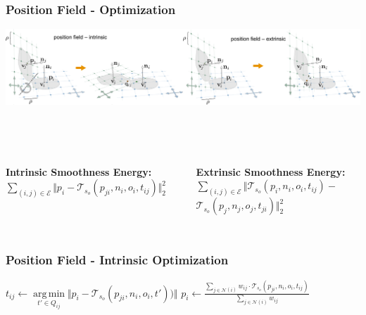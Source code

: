 \documentclass[aspectratio=43,sanserif,professionalfonts]{beamer}
\DeclareMathOperator*{\argmin}{arg\,min}
\begin{document}
\begin{frame}
	\frametitle{Position Field - Optimization}
	\includegraphics[width=\textwidth]{img/position-field-intrinsic-extrinsic-horizontal.png}

	~\\~\\
	\begin{columns}
		\begin{column}{0.5\textwidth}
			\textbf{Intrinsic Smoothness Energy:}\\
			$\sum\limits_{(i,j) \in \mathcal{E}} \Vert p_i - \mathcal{T}_{s_o}(p_{ji}, n_i, o_i, t_{ij}) \Vert^2_2$\\~\\~\\
		\end{column}
		\begin{column}{0.5\textwidth}
			\textbf{Extrinsic Smoothness Energy:}\\
			$\sum\limits_{(i,j) \in \mathcal{E}} \Vert \mathcal{T}_{s_o}(p_i, n_i, o_i, t_{ij}) -$\\
			\qquad\quad $\mathcal{T}_{s_o}(p_j, n_j, o_j, t_{ji}) \Vert^2_2$
		\end{column}
	\end{columns}
\end{frame}

\begin{frame}
	\frametitle{Position Field - Intrinsic Optimization}
	\begin{algorithm}[H]
		{
			{
				$t_{ij} \leftarrow \argmin\limits_{t' \in Q_{ij}} \Vert p_i - \mathcal{T}_{s_o}(p_{ji}, n_i, o_i, t')) \Vert$
			}
			$p_i \leftarrow \frac{\sum\limits_{j \in \mathcal{N}(i)} w_{ij} \cdot \mathcal{T}_{s_o}(p_{ji}, n_i, o_i, t_{ij})}{\sum\limits_{j \in \mathcal{N}(i)} w_{ij}}$\\
		}
	\end{algorithm}
\end{frame}
\end{document}
